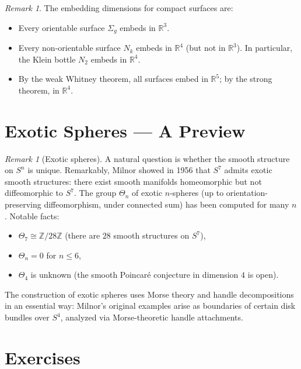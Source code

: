 \documentclass[12pt,a4paper,openany]{book}
\theoremstyle{definition}
\theoremstyle{remark}
\newtheorem{remark}[theorem]{Remark}
\newcommand{\Z}{\mathbb{Z}}
\newcommand{\R}{\mathbb{R}}
\begin{document}
\begin{remark}\label{rem:surface-embed}
The embedding dimensions for compact surfaces are:
\begin{itemize}
  \item Every orientable surface $\Sigma_g$ embeds in $\R^3$.
  \item Every non-orientable surface $N_k$ embeds in $\R^4$
    (but not in $\R^3$). In particular, the Klein bottle $N_2$
    embeds in $\R^4$.
  \item By the weak Whitney theorem, all surfaces embed in $\R^5$;
    by the strong theorem, in $\R^4$.
\end{itemize}
\end{remark}

\section{Exotic Spheres --- A Preview}\label{sec:exotic-spheres}

\begin{remark}[Exotic spheres]\label{rem:exotic-spheres}
A natural question is whether the smooth structure on $S^n$ is unique.
Remarkably, Milnor \cite{milnor-exotic} showed in 1956 that $S^7$ admits
exotic smooth structures: there exist smooth manifolds homeomorphic but
not diffeomorphic to $S^7$. The group $\Theta_n$ of exotic $n$-spheres
(up to orientation-preserving diffeomorphism, under connected sum) has been
computed for many $n$. Notable facts:
\begin{itemize}
  \item $\Theta_7 \cong \Z/28\Z$ (there are $28$ smooth structures on $S^7$),
  \item $\Theta_n = 0$ for $n \le 6$,
  \item $\Theta_4$ is unknown (the smooth Poincar\'{e} conjecture in
    dimension $4$ is open).
\end{itemize}
The construction of exotic spheres uses Morse theory and handle
decompositions in an essential way: Milnor's original examples arise as
boundaries of certain disk bundles over $S^4$, analyzed via Morse-theoretic
handle attachments.
\end{remark}

\section{Exercises}\label{sec:exo-whitney}
\end{document}
